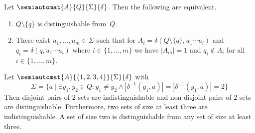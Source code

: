 \begin{proposition} \label{sync_max:prop:dist-n-1-set}
	Let $\semiautomat{A}{Q}{\Sigma}{\delta}$. Then the following are equivalent.
	\begin{enumerate}
		\item $Q \setminus \{q\}$ is distinguishable from~$Q$.
		
		\item There exist $u_1, \ldots, u_m \in \Sigma$
		such that for  $A_i = \delta(Q \setminus \{q\}, u_1 \cdots u_i)$
		and $q_i = \delta(q, u_1 \cdots u_i)$ where $i \in \{1,\ldots,m\}$
		we have  $|A_m| = 1$
		and $q_i \notin A_i$ for all $i \in \{1,\ldots,m\}$.
	\end{enumerate}
\end{proposition}

\begin{example}
	Let $\semiautomat{A}{\{1,2,3,4\}}{\Sigma}{\delta}$
	with 
	\[
	\Sigma = \{ a \mid \exists y_1, y_2 \in Q \colon y_1 \ne y_2 \land
	|\delta^{-1}(y_1, a)| = |\delta^{-1}(y_1, a)| = 2 \}
	\]
	Then disjoint pairs of $2$-sets are indistinguishable
	and non-disjoint pairs of $2$-sets are distinguishable.
	Furthermore, two sets of size at least three are indistinguishable.
	A set of size two is distinguishable from any set of size at least three.	
\end{example}